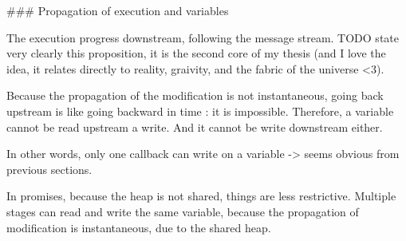 ### Propagation of execution and variables

The execution progress downstream, following the message stream.
TODO state very clearly this proposition, it is the second core of my thesis (and I love the idea, it relates directly to reality, graivity, and the fabric of the universe <3).

Because the propagation of the modification is not instantaneous, going back upstream is like going backward in time : it is impossible.
Therefore, a variable cannot be read upstream a write.
And it cannot be write downstream either.

In other words, only one callback can write on a variable -> seems obvious from previous sections.


In promises, because the heap is not shared, things are less restrictive.
Multiple stages can read and write the same variable, because the propagation of modification is instantaneous, due to the shared heap.
